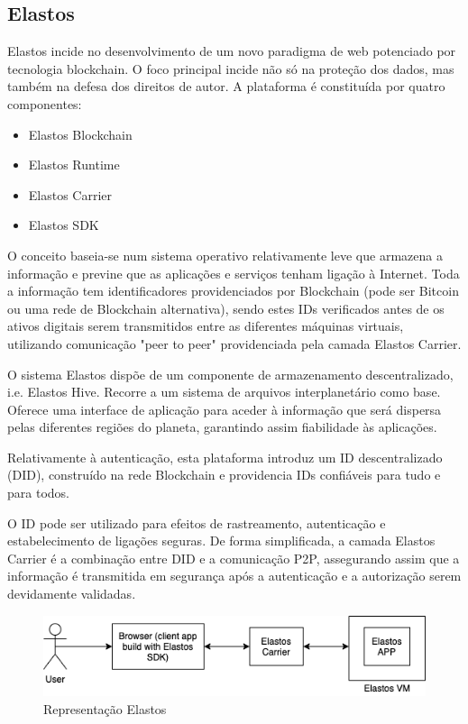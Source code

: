 \subsection{Elastos}
Elastos incide no desenvolvimento de um novo paradigma de web potenciado por tecnologia blockchain. O foco principal incide não só na proteção dos dados, mas também na defesa dos direitos de autor. A plataforma é constituída por quatro componentes:\cite{elastos_white_paper}
\begin{itemize}
	\item Elastos Blockchain
	\item Elastos Runtime
	\item Elastos Carrier
	\item Elastos SDK
\end{itemize}

O conceito baseia-se num sistema operativo relativamente leve que armazena a informação e previne que as aplicações e serviços tenham ligação à Internet. Toda a informação tem identificadores providenciados por Blockchain (pode ser Bitcoin ou uma rede de Blockchain alternativa), sendo estes IDs verificados antes de os ativos digitais serem transmitidos entre as diferentes máquinas virtuais, utilizando comunicação "peer to peer" providenciada pela camada Elastos Carrier.\cite{elastos_developer}

O sistema Elastos dispõe de um componente de armazenamento descentralizado, i.e. Elastos Hive. Recorre a um sistema de arquivos interplanetário como base. Oferece uma interface de aplicação para aceder à informação que será dispersa pelas diferentes regiões do planeta, garantindo assim fiabilidade às aplicações.\cite{elastos_white_paper}

Relativamente à autenticação, esta plataforma introduz um ID descentralizado (DID), construído na rede Blockchain e providencia IDs confiáveis para tudo e para todos. 

O ID pode ser utilizado para efeitos de rastreamento, autenticação e estabelecimento de ligações seguras. De forma simplificada, a camada Elastos Carrier é a combinação entre DID e a comunicação P2P, assegurando assim que a informação é transmitida em segurança após a autenticação e a autorização serem devidamente validadas.\cite{elastos_white_paper}

\begin{figure}[h]
    \begin{center}
    \includegraphics[width=1\textwidth]{figures/estado_arte-Elastos.png}
    \caption{Representação Elastos}
    \end{center}
\end{figure}
